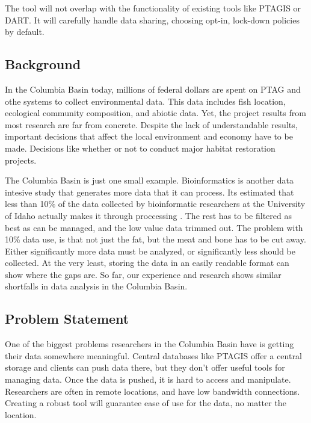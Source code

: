 The tool will not overlap with the functionality of existing tools like 
PTAGIS or DART. It will carefully handle data sharing,
choosing opt-in, lock-down policies by default.

\subsection{Background}
In the Columbia Basin today, millions of federal dollars are spent on PTAG 
and othe systems to collect environmental data. 
This data includes fish location, ecological community composition, and 
abiotic data. Yet, the project 
results from most research are far from concrete. Despite the lack of 
understandable results, important decisions that affect the local environment 
and economy have to be made. Decisions like whether or not to conduct 
major habitat restoration projects. 

The Columbia Basin is just one small example. Bioinformatics is another 
data intesive study that generates more data that it can process. Its 
estimated that less than 10\% of the data collected by bioinformatic 
researchers at the University of Idaho actually makes it through proccessing
\cite{foster}. The rest has to be filtered as best as can be managed, and the 
low value data trimmed out. The problem with 10\% data use, is that not just 
the fat, but the meat and bone has to be cut away. Either significantly more
data must be analyzed, or significantly less should be collected. At the very
least, storing the data in an easily readable format can show where the 
gaps are. So far, our experience and research shows similar shortfalls in 
data analysis in the Columbia Basin.

\subsection{Problem Statement}
One of the biggest problems researchers in the Columbia Basin have is getting
their data somewhere meaningful. Central databases like PTAGIS offer a 
central storage and clients can push data there, but they don't offer useful
tools for managing data. Once the data is pushed, it is hard to access and
manipulate. 
Researchers are often in remote locations, and have low bandwidth
connections. 
Creating a robust tool will guarantee ease of use for the data, no matter
the location.


